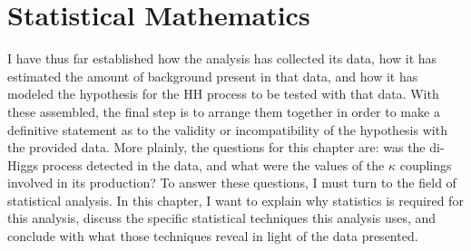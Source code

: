 %


\section{Statistical Mathematics}

    I have thus far established how the analysis has collected its data,
        how it has estimated the amount of background present in that data,
        and how it has modeled the hypothesis for the HH process to be tested with that data.
    With these assembled, the final step is to arrange them together in order to make a definitive statement
        as to the validity or incompatibility of the hypothesis with the provided data.
    More plainly, the questions for this chapter are:
        was the di-Higgs process detected in the data,
        and what were the values of the $\kappa$ couplings involved in its production?
    To answer these questions, I must turn to the field of statistical analysis.
    In this chapter, I want to explain why statistics is required for this analysis,
        discuss the specific statistical techniques this analysis uses,
        and conclude with what those techniques reveal in light of the data presented.

